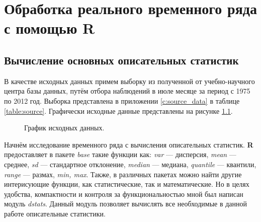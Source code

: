 \newpage

\chapter{Обработка реального временного ряда с помощью R}

\section{Вычисление основных описательных статистик} %
\label{sec:dstats}

В качестве исходных данных примем выборку из полученной от учебно-научного центра базы данных, путём отбора наблюдений в июле месяце за период с 1975 по 2012 год. Выборка представлена в приложении \ref{c:source_data} в таблице \ref{table:source}. Графически исходные данные представлены на рисунке \ref{img:input}.

\begin{figure}[ht]
\caption{График исходных данных.}
\label{img:input}
\end{figure}

Начнём исследование временного ряда с вычисления описательных статистик. \textbf{R} предоставляет в пакете \textit{base} такие функции как: \textit{var} --- дисперсия, \textit{mean} --- среднее, \textit{sd} --- стандартное отклонение, \textit{median} --- медиана, \textit{quantile} --- квантили, \textit{range} --- размах, \textit{min, max}. Также, в различных пакетах можно найти другие интерисующие функции, как статистические, так и математические. Но в целях удобства, компактности и контроля за функциональностью мной был написан модуль \textit{dstats}. Данный модуль позволяет вычислять все необходимые в данной работе описательные статистики. 

